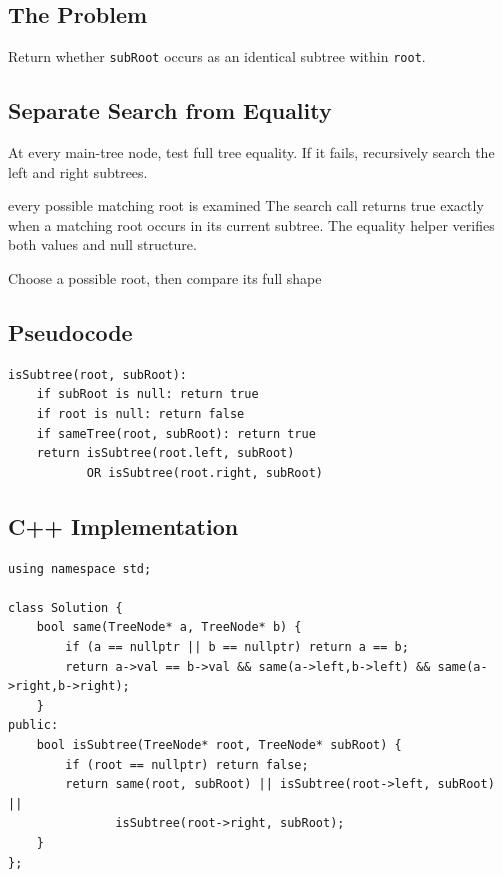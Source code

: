 \subsection{The Problem}
Return whether \texttt{subRoot} occurs as an identical subtree within
\texttt{root}.

\subsection{Separate Search from Equality}
At every main-tree node, test full tree equality. If it fails, recursively
search the left and right subtrees.

\begin{invariantbox}{every possible matching root is examined}
The search call returns true exactly when a matching root occurs in its
current subtree. The equality helper verifies both values and null structure.
\end{invariantbox}

\begin{visualbox}{Choose a possible root, then compare its full shape}
\centering
{}
\end{visualbox}

\subsection{Pseudocode}
\begin{lstlisting}[style=pseudocode]
isSubtree(root, subRoot):
    if subRoot is null: return true
    if root is null: return false
    if sameTree(root, subRoot): return true
    return isSubtree(root.left, subRoot)
           OR isSubtree(root.right, subRoot)
\end{lstlisting}

\subsection{C++ Implementation}
\begin{lstlisting}[style=compactcode,caption={Complete C++ solution: Subtree of Another Tree}]
using namespace std;

class Solution {
    bool same(TreeNode* a, TreeNode* b) {
        if (a == nullptr || b == nullptr) return a == b;
        return a->val == b->val && same(a->left,b->left) && same(a->right,b->right);
    }
public:
    bool isSubtree(TreeNode* root, TreeNode* subRoot) {
        if (root == nullptr) return false;
        return same(root, subRoot) || isSubtree(root->left, subRoot) ||
               isSubtree(root->right, subRoot);
    }
};
\end{lstlisting}

